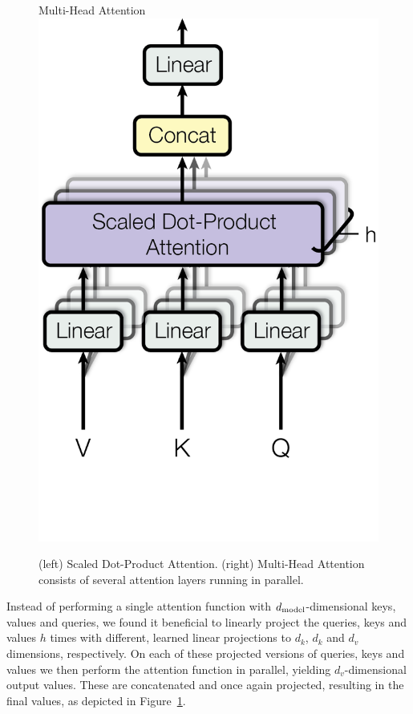 \begin{figure}
\begin{minipage}[t]{0.5\textwidth}
  \end{minipage}
  \begin{minipage}[t]{0.5\textwidth}
    \centering
    Multi-Head Attention \\
    \vspace{0.1cm}
    \includegraphics[scale=0.6]{Figures/ModalNet-20}
  \end{minipage}


  \caption{(left) Scaled Dot-Product Attention. (right) Multi-Head Attention
    consists of several attention layers running in parallel.}
  \label{fig:multi-head-att}
\end{figure}

Instead of performing a single attention function with $d_{\text{model}}$-dimensional
keys, values and queries, we found it beneficial to linearly project the
queries, keys and values $h$ times with different, learned linear projections
to $d_k$, $d_k$ and $d_v$ dimensions, respectively.
On each of these projected versions of queries, keys and values we then perform
the attention function in parallel, yielding $d_v$-dimensional output values.
These are concatenated and once again projected, resulting in the final values,
as depicted in Figure~\ref{fig:multi-head-att}.

